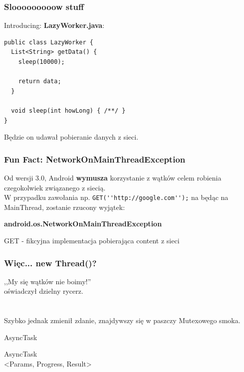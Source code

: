 \begin{frame}[fragile]\frametitle{Slooooooooow stuff}
Introducing: \textbf{LazyWorker.java}:
\begin{lstlisting}
public class LazyWorker {
  List<String> getData() {
    sleep(10000); 

    return data;
  }
  
  void sleep(int howLong) { /**/ }
}
\end{lstlisting}
Będzie on udawał pobieranie danych z sieci.
\end{frame}

\begin{frame}[fragile]\frametitle{Fun Fact: \textbf{NetworkOnMainThreadException}}

Od wersji 3.0, Android \textbf{wymusza} korzystanie z wątków celem robienia czegokolwiek
związanego z siecią.\\ 
W przypadku zawołania np. \verb|GET(''http://google.com'');| na będąc na MainThread, 
zostanie rzucony wyjątek:

\begin{center}
  \textbf{android.os.NetworkOnMainThreadException}
 \end{center}

\begin{flushright}
\small{GET - fikcyjna implementacja pobierająca content z sieci}
\end{flushright}
\end{frame}

\begin{frame}\frametitle{Więc... new Thread()?}
\begin{center}
 ,,My się wątków nie boimy!''\\
 oświadczył dzielny rycerz.\\

\pause 
\ \\
\ \\
Szybko jednak zmienił zdanie, znajdywszy się w paszczy Mutexowego smoka.
\end{center}
\end{frame}

\begin{frame}
 \begin{center}
  \Huge{AsyncTask}
 \end{center}
\end{frame}

\begin{frame}
 \begin{center}
  \Huge{AsyncTask\\ <Params, Progress, Result>}
 \end{center}
\end{frame}


